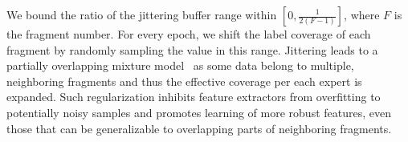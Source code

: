 \documentclass{article}
\def\ie{\textit{i.e}., } \def\Ie{\textit{I.e}., }
\theoremstyle{plain}
\theoremstyle{definition}
\theoremstyle{remark}
\begin{document}
We bound the ratio of the jittering buffer range  within $[0, \frac{1}{2(F-1)}]$, where $F$ is the fragment number.
For every epoch, we shift the label coverage of each fragment by randomly sampling the value in this range. %
Jittering leads to a partially overlapping mixture model~\citep{heller07, hinton02poe} as some data belong to multiple, neighboring fragments and thus the effective coverage per each expert is expanded.
Such regularization inhibits feature extractors from overfitting to potentially noisy samples and promotes learning of more robust features, even those that can be generalizable to overlapping parts of neighboring fragments.
\end{document}
